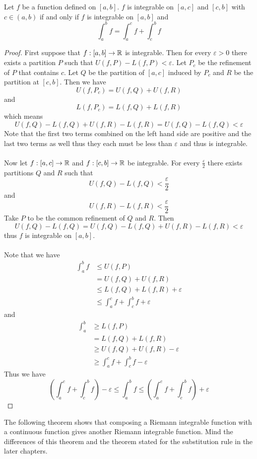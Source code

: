 \documentclass[a4paper]{article}
\begin{document}
\begin{thm}{}{} Let $f$ be a function defined on $[a,b]$. $f$ is integrable on $[a,c]$ and $[c,b]$ with $c\in(a,b)$ if and only if $f$ is integrable on $[a,b]$ and $$\int_{a}^{b}f=\int_{a}^{c}f+\int_{c}^{b}f$$ \tcbline
\begin{proof} First suppose that $f:[a,b]\to\mathbb{R}$ is integrable. Then for every $\varepsilon>0$ there exists a partition $P$ such that $U(f,P)-L(f,P)<\varepsilon$. Let $P_c$ be the refinement of $P$ that contains $c$. Let $Q$ be the partition of $[a,c]$ induced by $P_c$ and $R$ be the partition at $[c,b]$. Then we have $$U(f,P_c)=U(f,Q)+U(f,R)$$ and $$L(f,P_c)=L(f,Q)+L(f,R)$$ which means $$U(f,Q)-L(f,Q)+U(f,R)-L(f,R)=U(f,Q)-L(f,Q)<\varepsilon$$ Note that the first two terms combined on the left hand side are positive and the last two terms as well thus they each must be less than $\varepsilon$ and thus is integrable. \\~\\
Now let $f:[a,c]\to\mathbb{R}$ and $f:[c,b]\to\mathbb{R}$ be integrable. For every $\frac{\varepsilon}{2}$ there exists partitions $Q$ and $R$ such that $$U(f,Q)-L(f,Q)<\frac{\varepsilon}{2}$$ and $$U(f,R)-L(f,R)<\frac{\varepsilon}{2}$$ Take $P$ to be the common refinement of $Q$ and $R$. Then $$U(f,Q)-L(f,Q)=U(f,Q)-L(f,Q)+U(f,R)-L(f,R)<\varepsilon$$ thus $f$ is integrable on $[a,b]$. \\~\\
Note that we have 
\begin{align*}
\int_a^bf&\leq U(f,P)\\
&=U(f,Q)+U(f,R)\\
&\leq L(f,Q)+L(f,R)+\varepsilon\\
&\leq\int_a^cf+\int_c^bf+\varepsilon
\end{align*} and
\begin{align*}
\int_a^b&\geq L(f,P)\\
&=L(f,Q)+L(f,R)\\
&\geq U(f,Q)+U(f,R)-\varepsilon\\
&\geq\int_a^cf+\int_c^bf-\varepsilon
\end{align*}
Thus we have $$\left(\int_a^cf+\int_c^bf\right)-\varepsilon\leq\int_a^bf\leq\left(\int_a^cf+\int_c^bf\right)+\varepsilon$$
\end{proof}
\end{thm}

The following theorem shows that composing a Riemann integrable function with a continuous function gives another Riemann integrable function. Mind the differences of this theorem and the theorem stated for the substitution rule in the later chapters. 
\end{document}
